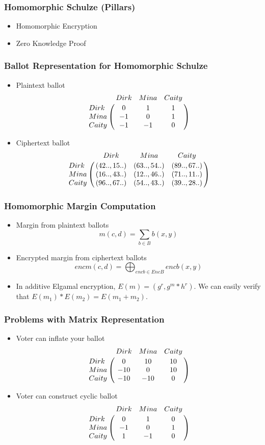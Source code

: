 \documentclass{beamer}
\begin{document}
\begin{frame}
\frametitle{Homomorphic Schulze (Pillars)}
\begin{itemize}
\item Homomorphic Encryption 
\item Zero Knowledge Proof
\end{itemize}

\end{frame}

\begin{frame}
\frametitle{Ballot Representation for Homomorphic Schulze}
\begin{itemize}
\item Plaintext ballot 
$$\bordermatrix{\text{}& Dirk & Mina & Caity \cr
                Dirk & 0 &  1 & 1\cr
                Mina & -1 &  0 & 1\cr
                Caity & -1 &  -1 & 0}$$ \pause
  
\item Ciphertext ballot 
  $$\bordermatrix{\text{}& Dirk & Mina & Caity \cr
                Dirk & (42.., 15..) & (63.., 54..) & (89.., 67..)\cr
                Mina & (16.., 43..) & (12.., 46..) & (71.., 11..)\cr
                Caity & (96.., 67..) & (54.., 43..) & (39.., 28..)}$$
 
  \end{itemize}
\end{frame}


\begin{frame}
\frametitle{Homomorphic Margin Computation}
\begin{itemize}
 \item Margin from plaintext ballots 
    \[ m(c, d) = \sum_{b \in B} b(x, y) \]\pause

 \item Encrypted margin from ciphertext ballots
      \[ encm(c, d) = \bigoplus_{encb \in EncB} encb(x, y) \] \pause
      
 \item In additive Elgamal encryption, $E(m) = (g^r, g^m * h^r)$. We can easily 
  	verify that $E(m_{1}) * E(m_{2}) = E (m_{1} + m_{2})$.     
\end{itemize}

\end{frame}

\begin{frame}
\frametitle{Problems with Matrix Representation}
\begin{itemize}
\item Voter can inflate your ballot
$$\bordermatrix{\text{}& Dirk & Mina & Caity \cr
                Dirk & 0 &  10 & 10\cr
                Mina & -10 &  0 & 10\cr
                Caity & -10 &  -10 & 0}$$ \pause
         
\item Voter can construct cyclic ballot
$$\bordermatrix{\text{}& Dirk & Mina & Caity \cr
                Dirk & 0 &  1 & 0\cr
                Mina & -1 &  0 & 1\cr
                Caity & 1 & -1 & 0}$$
                
\end{itemize}
                
\end{frame}
\end{document}
